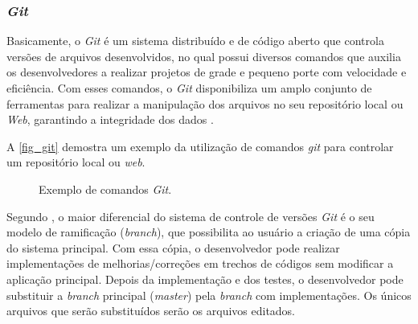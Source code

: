 \subsubsection{\textit{Git}}

Basicamente, o \textit{Git} é um sistema distribuído e de código aberto que controla versões de arquivos desenvolvidos, no qual possui diversos comandos que auxilia os desenvolvedores a realizar projetos de grade e pequeno porte com velocidade e eficiência.  Com esses comandos, o \textit{Git} disponibiliza um amplo conjunto de ferramentas para realizar a manipulação dos arquivos no seu repositório local ou \textit{Web}, garantindo a integridade dos dados \cite{GIT2010}.

A \autoref{fig_git} demostra um exemplo da utilização de comandos \textit{git} para controlar um repositório local ou \textit{web}.

\begin{figure}[h]
	\caption{\label{fig_git}Exemplo de comandos \textit{Git}.}
	\begin{center}
	\end{center}
	\centering {}
\end{figure}

Segundo , o maior diferencial do sistema de controle de versões \textit{Git} é o seu modelo de ramificação (\textit{branch}), que possibilita ao usuário a criação de uma cópia do sistema principal. Com essa cópia, o desenvolvedor pode realizar implementações de melhorias/correções em trechos de códigos sem modificar a aplicação principal. Depois da implementação e dos testes, o desenvolvedor pode substituir a \textit{branch} principal (\textit{master}) pela \textit{branch} com implementações. Os únicos arquivos que serão substituídos serão os arquivos editados.